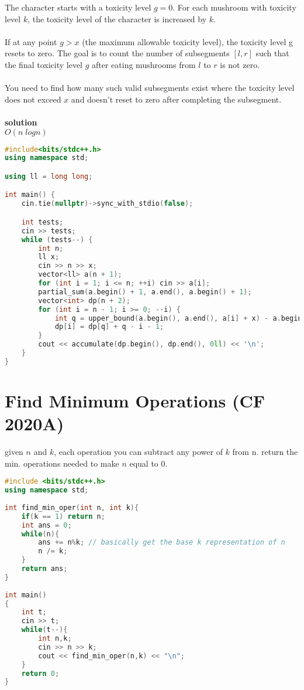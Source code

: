 \documentclass[11pt]{article}
\newcommand{\br}{\\\;\\} %
\newcommand{\soln}{\textbf{solution}\\}
\begin{document}
The character starts with a toxicity level $g = 0$. For each mushroom with toxicity level $k$, the toxicity level of the character is increased by $k$. \br

If at any point $g > x$ (the maximum allowable toxicity level), the toxicity level g resets to zero. The goal is to count the number of subsegments $[l, r]$ such that the final toxicity level $g$ after eating mushrooms from $l$ to $r$ is not zero.\br

You need to find how many such valid subsegments exist where the toxicity level does not exceed $x$ and doesn't reset to zero after completing the subsegment.\br
\soln 
$O(n\;log n)$
\begin{lstlisting}[language=C++]
#include<bits/stdc++.h>
using namespace std;

using ll = long long;

int main() {
    cin.tie(nullptr)->sync_with_stdio(false);

    int tests;
    cin >> tests;
    while (tests--) {
        int n;
        ll x;
        cin >> n >> x;
        vector<ll> a(n + 1);
        for (int i = 1; i <= n; ++i) cin >> a[i];
        partial_sum(a.begin() + 1, a.end(), a.begin() + 1);
        vector<int> dp(n + 2);
        for (int i = n - 1; i >= 0; --i) {
            int q = upper_bound(a.begin(), a.end(), a[i] + x) - a.begin();
            dp[i] = dp[q] + q - i - 1;
        }
        cout << accumulate(dp.begin(), dp.end(), 0ll) << '\n';
    }
}
\end{lstlisting}

\section{Find Minimum Operations (CF 2020A)}
given $n$ and $k$, each operation you can subtract any power of $k$ from n. return the min. operations needed to make $n$ equal to 0.

\begin{lstlisting}[language=C++]
#include <bits/stdc++.h>
using namespace std;
 
int find_min_oper(int n, int k){
	if(k == 1) return n;
	int ans = 0;
	while(n){
		ans += n%k; // basically get the base k representation of n
		n /= k; 
	}
	return ans;
}
 
int main()
{
	int t;
	cin >> t;
	while(t--){
		int n,k;
		cin >> n >> k;
		cout << find_min_oper(n,k) << "\n";
	}
    return 0;
}
\end{lstlisting}
\end{document}
